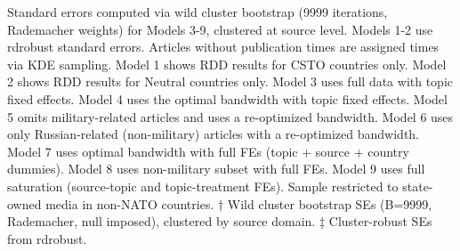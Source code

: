 \begin{table}[!t]
\begin{minipage}{\linewidth}
Standard errors computed via wild cluster bootstrap (9999 iterations, Rademacher
weights) for Models 3-9, clustered at source level. Models 1-2 use rdrobust
standard errors. Articles without publication times are assigned times via KDE
sampling. Model 1 shows RDD results for CSTO countries only. Model 2 shows RDD
results for Neutral countries only. Model 3 uses full data with topic fixed
effects. Model 4 uses the optimal bandwidth with topic fixed effects. Model 5
omits military-related articles and uses a re-optimized bandwidth. Model 6 uses
only Russian-related (non-military) articles with a re-optimized bandwidth.
Model 7 uses optimal bandwidth with full FEs (topic + source + country dummies).
Model 8 uses non-military subset with full FEs. Model 9 uses full saturation
(source-topic and topic-treatment FEs). Sample restricted to state-owned media
in non-NATO countries. † Wild cluster bootstrap SEs (B=9999, Rademacher, null
imposed), clustered by source domain. ‡ Cluster-robust SEs from rdrobust.\\
\end{minipage}
\end{table}

